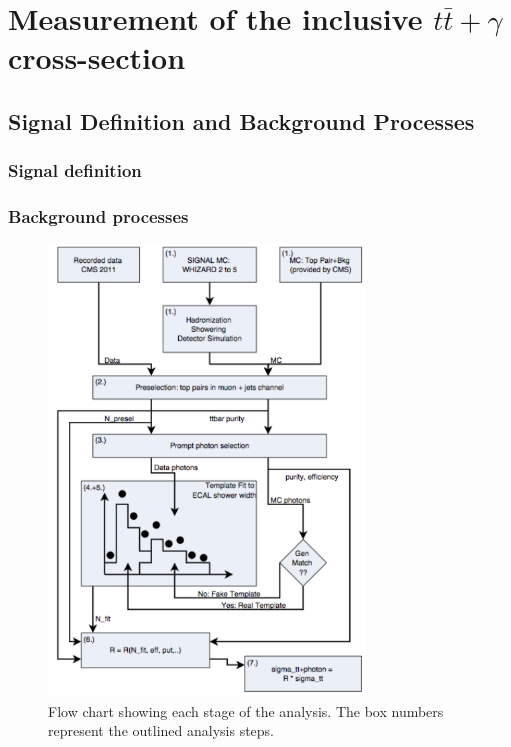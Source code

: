 \chapter{Measurement of the inclusive $t\bar{t}+\gamma$ cross-section}\label{chap-crosssection}

\section{Signal Definition and Background Processes}

\subsection{Signal definition}

\subsection{Background processes}

\begin{figure}\label{fig-AnalysisFlowChart}
\begin{center}
\includegraphics[width=0.75\textwidth]{Figures/AnalysisFlowChart.png}
\caption{Flow chart showing each stage of the analysis. The box numbers represent the outlined
analysis steps.}
\end{center}
\end{figure}

